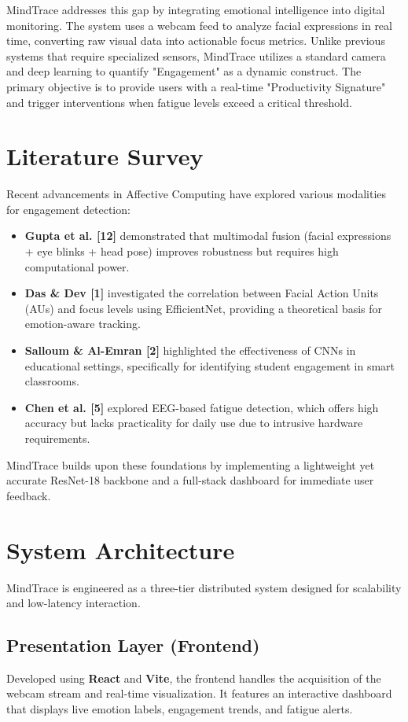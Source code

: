 \documentclass[conference]{IEEEtran}
\begin{document}
MindTrace addresses this gap by integrating emotional intelligence into digital monitoring. The system uses a webcam feed to analyze facial expressions in real time, converting raw visual data into actionable focus metrics. Unlike previous systems that require specialized sensors, MindTrace utilizes a standard camera and deep learning to quantify "Engagement" as a dynamic construct. The primary objective is to provide users with a real-time "Productivity Signature" and trigger interventions when fatigue levels exceed a critical threshold.

\section{Literature Survey}
Recent advancements in Affective Computing have explored various modalities for engagement detection:
\begin{itemize}[leftmargin=*]
    \item \textbf{Gupta et al. [12]} demonstrated that multimodal fusion (facial expressions + eye blinks + head pose) improves robustness but requires high computational power.
    \item \textbf{Das \& Dev [1]} investigated the correlation between Facial Action Units (AUs) and focus levels using EfficientNet, providing a theoretical basis for emotion-aware tracking.
    \item \textbf{Salloum \& Al-Emran [2]} highlighted the effectiveness of CNNs in educational settings, specifically for identifying student engagement in smart classrooms.
    \item \textbf{Chen et al. [5]} explored EEG-based fatigue detection, which offers high accuracy but lacks practicality for daily use due to intrusive hardware requirements.
\end{itemize}
MindTrace builds upon these foundations by implementing a lightweight yet accurate ResNet-18 backbone and a full-stack dashboard for immediate user feedback.

\section{System Architecture}
MindTrace is engineered as a three-tier distributed system designed for scalability and low-latency interaction.

\subsection{Presentation Layer (Frontend)}
Developed using \textbf{React} and \textbf{Vite}, the frontend handles the acquisition of the webcam stream and real-time visualization. It features an interactive dashboard that displays live emotion labels, engagement trends, and fatigue alerts.
\end{document}
